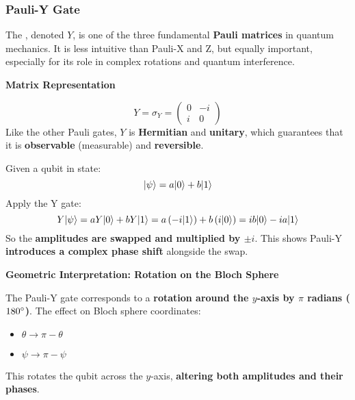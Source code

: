 \subsubsection{Pauli-Y Gate}

The , denoted $Y$, is one of the three fundamental \textbf{Pauli matrices} in quantum mechanics. It is less intuitive than Pauli-X and Z, but equally important, especially for its role in complex rotations and quantum interference.

\highspace
\begin{flushleft}
    \textcolor{Green3}{ \textbf{Matrix Representation}}
\end{flushleft}
\begin{equation*}
    Y = \sigma_{Y} = \begin{pmatrix}
        0 & -i \\ i & 0
    \end{pmatrix}
\end{equation*}
Like the other Pauli gates, $Y$ is \textbf{Hermitian} and \textbf{unitary}, which guarantees that it is \textbf{observable} (measurable) and \textbf{reversible}.

\highspace
\begin{flushleft}
    \textcolor{Green3}{}
\end{flushleft}
Given a qubit in state:
\begin{equation*}
	| \psi \rangle = a| 0 \rangle + b| 1 \rangle
\end{equation*}
Apply the Y gate:
\begin{equation*}
	Y| \psi \rangle = aY| 0 \rangle + bY| 1 \rangle = a\left(-i | 1 \rangle\right) + b\left(i | 0 \rangle\right) = ib| 0 \rangle - ia| 1 \rangle
\end{equation*}
So the \textbf{amplitudes are swapped and multiplied by $\pm i$}. This shows Pauli-Y \textbf{introduces a complex phase shift} alongside the swap.

\highspace
\begin{flushleft}
    \textcolor{Green3}{ \textbf{Geometric Interpretation: Rotation on the Bloch Sphere}}
\end{flushleft}
The Pauli-Y gate corresponds to a \textbf{rotation around the $y$-axis by $\pi$ radians ($180 \degree$)}. The effect on Bloch sphere coordinates:
\begin{itemize}
    \item $\theta \rightarrow \pi - \theta$
    \item $\psi \rightarrow \pi - \psi$
\end{itemize}
This rotates the qubit across the $y$-axis, \textbf{altering both amplitudes and their phases}.

